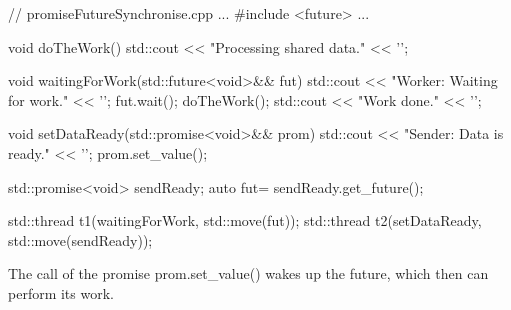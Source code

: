 
\begin{cpp}
// promiseFutureSynchronise.cpp
...
#include <future>
...

void doTheWork(){
	std::cout << "Processing shared data." << '\n';
}

void waitingForWork(std::future<void>&& fut){
	std::cout << "Worker: Waiting for work." <<
	'\n';
	fut.wait();
	doTheWork();
	std::cout << "Work done." << '\n';
}

void setDataReady(std::promise<void>&& prom){
	std::cout << "Sender: Data is ready." <<
	'\n';
	prom.set_value();
}

std::promise<void> sendReady;
auto fut= sendReady.get_future();

std::thread t1(waitingForWork, std::move(fut));
std::thread t2(setDataReady, std::move(sendReady));
\end{cpp}

The call of the promise prom.set\_value() wakes up the future, which then can perform its work.














